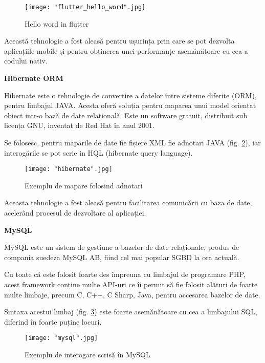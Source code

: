 \documentclass[a4paper, 12pt]{article}
\begin{document}
	\begin{figure}[H]
		\centering
		\texttt{[image: "flutter\_hello\_word".jpg]}
		\caption{Hello word in flutter}\label{fig:flutter_hello_word}
	\end{figure}
	
	\qquad Această tehnologie a fost aleasă pentru ușurința prin care se pot dezvolta aplicațiile mobile și pentru obținerea unei performanțe asemănătoare cu cea a codului nativ.
	
	\newpage
	\textbf{Hibernate ORM \cite{o2008object}}
	
	\qquad Hibernate este o tehnologie de convertire a datelor între sisteme diferite (ORM), pentru limbajul JAVA. Acesta oferă soluția pentru maparea unui model orientat obiect intr-o bază de date relațională. Este un software gratuit, distribuit sub licența GNU, inventat de Red Hat în anul 2001.
	
	\qquad Se folosesc, pentru maparile de date fie fișiere XML fie adnotari JAVA (fig. \ref{fig:hibernate}), iar interogările se pot scrie in HQL (hibernate query language).
	
	
	\begin{figure}[H]
		\centering
		\texttt{[image: "hibernate".jpg]}
		\caption{Exemplu de mapare folosind adnotari}\label{fig:hibernate}
	\end{figure}
	
	\qquad Aceasta tehnologie a fost aleasă pentru facilitarea comunicării cu baza de date, acelerând procesul de dezvoltare al aplicației.
	
	\newpage
	\textbf{MySQL \cite{dubois1999mysql}}
	
	\qquad MySQL este un sistem de gestiune a bazelor de date relaționale, produs de compania suedeza MySQL AB, fiind cel mai popular SGBD la ora actuală.
	
	\qquad 	Cu toate că este folosit foarte des împreuna cu limbajul de programare PHP, acest framework conține multe API-uri ce îi permit să fie folosit alături de foarte multe limbaje, precum C, C++, C Sharp, Java, pentru accesarea bazelor de date.
	
	\qquad Sintaxa acestui limbaj (fig. \ref{fig::mysql}) este foarte asemănătoare cu cea a limbajului SQL, diferind în foarte puține locuri.
	
	\begin{figure}[H]
		\centering
		\texttt{[image: "mysql".jpg]}
		\caption{Exemplu de interogare scrisă în MySQL}\label{fig::mysql}
	\end{figure} 
	
\end{document}
